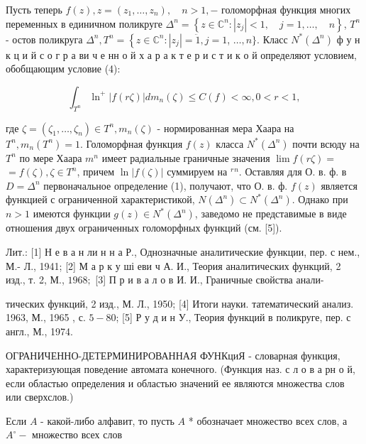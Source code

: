 \documentclass[10pt]{article}
\begin{document}
Пусть теперь $f(z), z=\left(z_{1}, \ldots, z_{n}\right), \quad n>1,-$ голоморфная функция многих переменных в единичном поликруге $\Delta^{n}=\left\{z \in \mathbb{C}^{n}:\left|z_{j}\right|<1, \quad j=1, \ldots, \quad n\right\}$, $T^{n}$ - остов поликруга $\Delta^{n}, T^{n}=\left\{z \in \mathbb{C}^{n}:\left|z_{j}\right|=\ddot{1}, j=1\right.$, $\ldots, n\}$. Класс $N^{*}\left(\Delta^{n}\right)$ ф у н к ц и й с о г р а ви ч е нн о й х а р а к т е р и с т и к о й определяют условием, обобщающим условие (4):



\[

\int_{T^{n}} \ln ^{+}|f(r \zeta)| d m_{n}(\zeta) \leqslant C(f)<\infty, 0<r<1,

\]



где $\zeta=\left(\zeta_{1}, \ldots, \zeta_{n}\right) \in T^{n}, m_{n}(\zeta)$ - нормированная мера Хаара на $T^{n}, m_{n}\left(T^{n}\right)=1$. Голоморфная функция $f(z)$ класса $N^{*}\left(\Delta^{n}\right)$ почти всюду на $T^{n}$ по мере Хаара $m^{n}$ имеет радиальные граничные значения $\lim f(r \zeta)=$ $=f(\zeta), \zeta \in T^{n}$, причем $\ln |f(\zeta)|$ суммируем на ${ }^{r}{ }^{n}$. Оставляя для О. в. ф. в $D=\Delta^{n}$ первоначальное определение (1), получают, что О. в. ф. $f(z)$ является функцией с ограниченной характеристикой, $N\left(\Delta^{n}\right) \subset N^{*}\left(\Delta^{n}\right)$. Однако при $n>1$ имеются функции $g(z) \in N^{*}\left(\Delta^{n}\right)$, заведомо не представимые в виде отношения двух ограниченных голоморфных функций (см. [5]).



Лит.: [1] Н е в а н ли н н а Р., Однозначные аналитические функции, пер. с нем., М.- Л., 1941; [2] М а р к у ші еви ч А. И., Теория аналитических функций, 2 изд., т. 2, М., $1968 ;$ [3] П р и в а л о в И. И., Граничные свойства анали-

тических функций, 2 изд., М. Л., 1950; [4] Итоги науки. татематический анализ. 1963, М., 1965 , с. $5-80$; [5] Р у д и н У., Теория функций в поликруге, пер. с англ., М., 1974.



ОГРАНИЧЕННО-ДЕТЕРМИНИРОВАННАЯ ФУНКциЯ - словарная функция, характеризующая поведение автомата конечного. (Функция наз. с л о в а рн о й, если областью определения и областью значений ее являются множества слов или сверхслов.)



Если $A$ - какой-либо алфавит, то пусть $A$ * обозначает множество всех слов, а $A^{\circ}-$ множество всех слов
\end{document}
